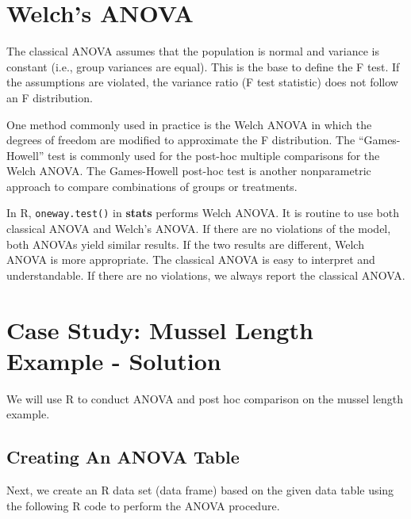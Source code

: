 \documentclass[
]{book}
\begin{document}
\hypertarget{welchs-anova}{%
\section{Welch's ANOVA}\label{welchs-anova}}

The classical ANOVA assumes that the population is normal and variance is constant (i.e., group variances are equal). This is the base to define the F test. If the assumptions are violated, the variance ratio (F test statistic) does not follow an F distribution.

One method commonly used in practice is the Welch ANOVA in which the degrees of freedom are modified to approximate the F distribution. The ``Games-Howell'' test is commonly used for the post-hoc multiple comparisons for the Welch ANOVA. The Games-Howell post-hoc test is another nonparametric approach to compare combinations of groups or treatments.

In R, \texttt{oneway.test()} in \textbf{stats} performs Welch ANOVA. It is routine to use both classical ANOVA and Welch's ANOVA. If there are no violations of the model, both ANOVAs yield similar results. If the two results are different, Welch ANOVA is more appropriate. The classical ANOVA is easy to interpret and understandable. If there are no violations, we always report the classical ANOVA.

\hypertarget{case-study-mussel-length-example---solution}{%
\section{Case Study: Mussel Length Example - Solution}\label{case-study-mussel-length-example---solution}}

We will use R to conduct ANOVA and post hoc comparison on the mussel length example.

\hypertarget{creating-an-anova-table}{%
\subsection{Creating An ANOVA Table}\label{creating-an-anova-table}}

Next, we create an R data set (data frame) based on the given data table using the following R code to perform the ANOVA procedure.
\end{document}

